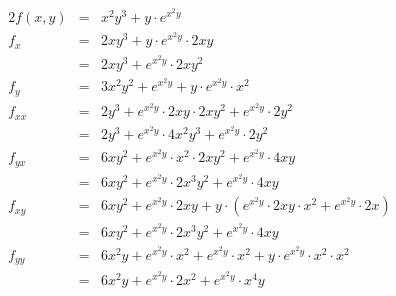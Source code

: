 \documentclass[10pt,a4paper,oneside,ngerman,numbers=noenddot]{scrartcl}
\begin{document}
\section{} %
\begin{alignat*}{2}
f(x,y) &=& x^{2}y^{3} + y \cdot e^{x^{2}y} \\
f_{x} &=& 2xy^{3} + y \cdot e^{x^{2}y} \cdot 2xy\\
&=& 2xy^{3} + e^{x^{2}y} \cdot 2xy^{2} \\
f_{y} &=& 3x^{2}y^{2} + e^{x^{2}y} + y \cdot e^{x^{2}y} \cdot x^{2} \\
f_{xx} &=& 2y^{3} + e^{x^{2}y} \cdot 2xy \cdot 2xy^{2} + e^{x^{2}y} \cdot 2y^{2}\\ 
&=& 2y^{3} + e^{x^{2}y} \cdot 4x^{2}y^{3} + e^{x^{2}y} \cdot 2y^{2} \\
f_{yx} &=& 6xy^{2} + e^{x^{2}y} \cdot x^{2} \cdot 2xy^{2} + e^{x^{2}y} \cdot 4xy\\ 
&=& 6xy^{2} + e^{x^{2}y} \cdot 2x^{3}y^{2} + e^{x^{2}y} \cdot 4xy \\
f_{xy} &=& 6xy^{2} + e^{x^{2}y} \cdot 2xy + y \cdot (e^{x^{2}y} \cdot 2xy \cdot x^{2} + e^{x^{2}y} \cdot 2x)\\ 
&=& 6xy^{2} + e^{x^{2}y} \cdot 2x^{3}y^{2} + e^{x^{2}y} \cdot 4xy \\
f_{yy} &=& 6x^{2}y + e^{x^{2}y} \cdot x^{2} + e^{x^{2}y} \cdot x^{2} + y \cdot e^{x^{2}y} \cdot x^{2} \cdot x^{2} \\
&=& 6x^{2}y + e^{x^{2}y} \cdot 2x^{2} + e^{x^{2}y} \cdot x^{4}y
\end{alignat*}
\section{} %
\setcounter{subsubsection}{0}
\end{document}
